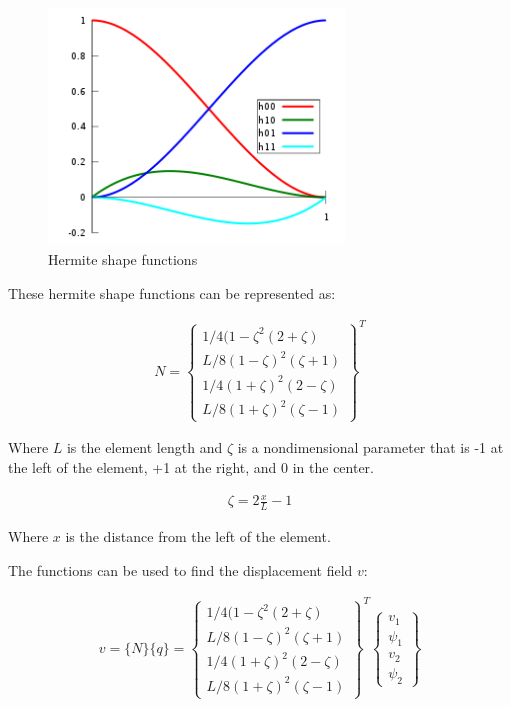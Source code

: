 \documentclass[10pt,letterpaper]{article}
\begin{document}
	\begin{figure}[H]
		\includegraphics[width=0.7\textwidth]{hermite.png}
		\caption{Hermite shape functions}
	\end{figure}

	These hermite shape functions can be represented as:

	\begin{align}
		N = \begin{Bmatrix}
				1/4 (1-\zeta^2 (2+\zeta) \\
				L/8 (1-\zeta)^2 (\zeta+1) \\
				1/4 (1+\zeta)^2 (2-\zeta) \\
				L/8 (1+\zeta)^2 (\zeta-1) 
		\end{Bmatrix}^T
	\end{align}

	Where $L$ is the element length and $\zeta$ is a nondimensional parameter that is -1 at the left of the element, +1 at the right, and 0 in the center.

	\begin{align}
		\zeta = 2 \frac{x}{L} - 1
	\end{align}

	Where $x$ is the distance from the left of the element.

	The functions can be used to find the displacement field $v$:

	\begin{align}
		v = \{N\} \{q\} =
		\begin{Bmatrix}
				1/4 (1-\zeta^2 (2+\zeta) \\
				L/8 (1-\zeta)^2 (\zeta+1) \\
				1/4 (1+\zeta)^2 (2-\zeta) \\
				L/8 (1+\zeta)^2 (\zeta-1) 
		\end{Bmatrix}^T 
		\begin{Bmatrix}
			v_1 \\
			\psi_1 \\
			v_2 \\
			\psi_2 
		\end{Bmatrix}
	\end{align}
\end{document}
